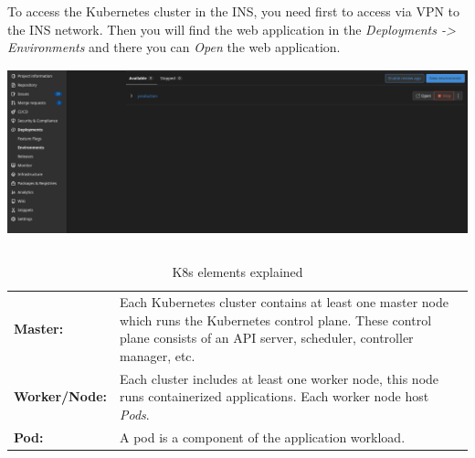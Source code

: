 To access the Kubernetes cluster in the INS, you need first to access via VPN to the INS network. Then you will find the web application in the \textit{Deployments -> Environments} and there you can \textit{Open} the web application. \newline
\includegraphics[height=5.5cm]{resources/web-application-INS.png}

\begin{table}[H]
  \begin{tabular*}{\textwidth}{p{3.5cm} | p{9cm}}
    \textbf{Master:}
      & Each Kubernetes cluster contains at least one master node which runs the Kubernetes control plane. These control plane consists of an API server, scheduler, controller manager, etc. \bigskip \\
    \textbf{Worker/Node:}
      & Each cluster includes at least one worker node, this node runs containerized applications. Each worker node host \textit{Pods}. \bigskip \\
    \textbf{Pod:}
      & A pod is a component of the application workload. \\
  \end{tabular*}
  \caption{K8s elements explained}
  \label{tab:k8s-elements-explained}
\end{table}

